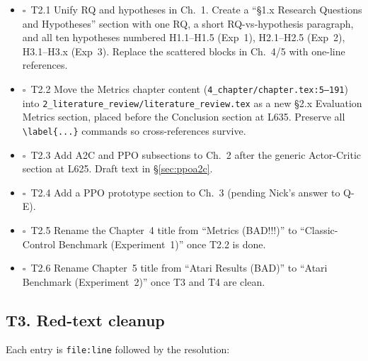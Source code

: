 \documentclass[11pt,a4paper]{article}
\newcommand{\todoitem}{$\square$~}
\newcommand{\fileline}[1]{\texttt{\small #1}}
\begin{document}
\begin{itemize}[leftmargin=*,itemsep=2pt]
  \item \todoitem T2.1 Unify RQ and hypotheses in Ch.~1. Create a
  ``\S1.x Research Questions and Hypotheses'' section with one RQ, a
  short RQ-vs-hypothesis paragraph, and all ten hypotheses numbered
  H1.1--H1.5 (Exp~1), H2.1--H2.5 (Exp~2), H3.1--H3.x (Exp~3). Replace
  the scattered blocks in Ch.~4/5 with one-line references.
  \item \todoitem T2.2 Move the Metrics chapter content
  (\fileline{4\_chapter/chapter.tex:5--191}) into
  \fileline{2\_literature\_review/literature\_review.tex} as a new
  \S2.x Evaluation Metrics section, placed before the Conclusion
  section at L635. Preserve all \fileline{\textbackslash label\{...\}}
  commands so cross-references survive.
  \item \todoitem T2.3 Add A2C and PPO subsections to Ch.~2 after the
  generic Actor-Critic section at L625. Draft text in
  \S\ref{sec:ppoa2c}.
  \item \todoitem T2.4 Add a PPO prototype section to Ch.~3
  (pending Nick's answer to Q-E).
  \item \todoitem T2.5 Rename the Chapter~4 title from
  ``Metrics (BAD!!!)'' to ``Classic-Control Benchmark (Experiment~1)''
  once T2.2 is done.
  \item \todoitem T2.6 Rename Chapter~5 title from ``Atari Results (BAD)''
  to ``Atari Benchmark (Experiment~2)'' once T3 and T4 are clean.
\end{itemize}

\subsection*{T3. Red-text cleanup}

Each entry is \fileline{file:line} followed by the resolution:
\end{document}
